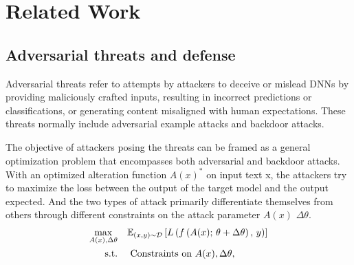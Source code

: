 \section{Related Work}
\subsection{Adversarial threats and defense }

Adversarial threats refer to attempts by attackers to deceive or mislead DNNs by providing maliciously crafted inputs, resulting in incorrect predictions or classifications, or generating content misaligned with human expectations. These threats normally include adversarial example attacks and backdoor attacks.

The objective of attackers posing the threats can be framed as a general optimization problem that encompasses both adversarial and backdoor attacks. With an optimized alteration function $A(x)^*$ on input text x, the attackers try to maximize the loss between the output of the target model and the output expected. And the two types of attack primarily differentiate themselves from others through different constraints on the attack parameter $A(x)$  $\Delta\theta$.
\begin{align} 
\max_{A(x), \Delta\theta} \quad & \mathbb{E}_{(x, y) \sim \mathcal{D}} \left[ L\left(f\left(A(x);\, \theta + \Delta\theta\right),\, y\right) \right] \notag \\
\text{s.t.} \quad &\text{ Constraints on } A(x),  \Delta\theta,
\label{eq:optimization}
\end{align}

